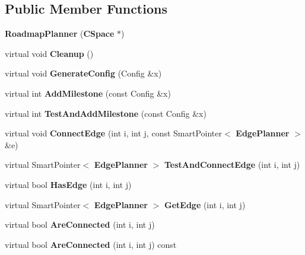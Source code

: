 \subsection*{Public Member Functions}
\begin{DoxyCompactItemize}
\item 
{\bfseries Roadmap\+Planner} ({\bf C\+Space} $\ast$)\label{classRoadmapPlanner_a7b276703b4d691ee7fe0850f4a191b73}

\item 
virtual void {\bfseries Cleanup} ()\label{classRoadmapPlanner_a69517e7d31b79b69f7a994a421bf7888}

\item 
virtual void {\bfseries Generate\+Config} (Config \&x)\label{classRoadmapPlanner_a94389ad2dc2ca5df788e6d5e40142fa3}

\item 
virtual int {\bfseries Add\+Milestone} (const Config \&x)\label{classRoadmapPlanner_a63dfd4b47ca8a732ecdfb876f3fb0d1f}

\item 
virtual int {\bfseries Test\+And\+Add\+Milestone} (const Config \&x)\label{classRoadmapPlanner_a796a45620cc5ebefac828fadbc419108}

\item 
virtual void {\bfseries Connect\+Edge} (int i, int j, const Smart\+Pointer$<$ {\bf Edge\+Planner} $>$ \&e)\label{classRoadmapPlanner_a6dec2cb3e5b0c13c3218af35873bd6a0}

\item 
virtual Smart\+Pointer$<$ {\bf Edge\+Planner} $>$ {\bfseries Test\+And\+Connect\+Edge} (int i, int j)\label{classRoadmapPlanner_a0e75b9d7612d0a6e778c182dcf6943c8}

\item 
virtual bool {\bfseries Has\+Edge} (int i, int j)\label{classRoadmapPlanner_a6992c75b12c8037424b0f45542152742}

\item 
virtual Smart\+Pointer$<$ {\bf Edge\+Planner} $>$ {\bfseries Get\+Edge} (int i, int j)\label{classRoadmapPlanner_ab989251a26e9d6ba6535f9f5f6617746}

\item 
virtual bool {\bfseries Are\+Connected} (int i, int j)\label{classRoadmapPlanner_a0a9604e09d188c64dcf0f447b2e54a9c}

\item 
virtual bool {\bfseries Are\+Connected} (int i, int j) const \label{classRoadmapPlanner_a23c2a9cda5c6e5537779d38a0c3ab94a}


\end{DoxyCompactItemize}
